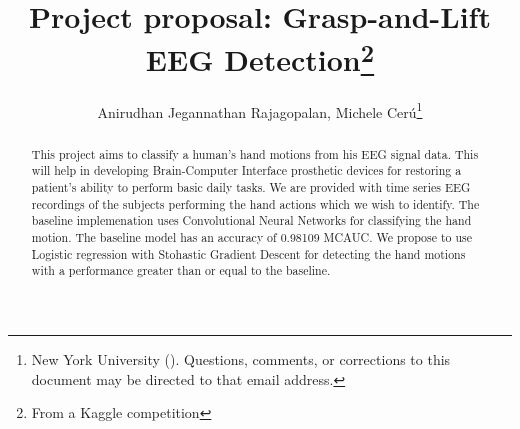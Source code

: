 \documentclass[final,leqno,onefignum,onetabnum]{siamltexmm}
\title{Project proposal: Grasp-and-Lift EEG Detection\thanks{From a Kaggle competition}}
\author{Anirudhan Jegannathan Rajagopalan, Michele Cer\'u\thanks{New York University (\email{ajr619@nyu.edu; mc3784@nyu.edu}). Questions, comments, or corrections
to this document may be directed to that email address.}}
\begin{document}
\maketitle
\newcommand{\slugmaster}{%
\slugger{siads}{xxxx}{xx}{x}{x---x}}%

  \begin{abstract}
    This project aims to classify a human's hand motions from his EEG signal data.  This will help in developing Brain-Computer Interface prosthetic devices for restoring a patient's ability to perform basic daily tasks.
    We are provided with time series EEG recordings of the subjects performing the hand actions which we wish to identify.
    The baseline implemenation uses Convolutional Neural Networks for classifying the hand motion.  The baseline model has an accuracy of 0.98109 MCAUC\@.  
    We propose to use Logistic regression with Stohastic Gradient Descent for detecting the hand motions with a performance greater than or equal to the baseline.
  \end{abstract}

  \pagestyle{myheadings}
  \thispagestyle{plain}
\end{document}

